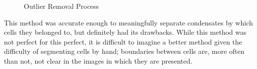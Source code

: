 \documentclass[11pt]{article}
\begin{document}
\begin{figure}[H]
    \centering
    {
    }\hfill{
    }\caption{Outlier Removal Process}
    \label{fig:outlier_removal}
\end{figure}


This method was accurate enough to meaningfully separate condensates by which cells they belonged
to, but definitely had its drawbacks. While this method was not perfect for this perfect, it is
difficult to imagine a better method given the difficulty of segmenting cells by hand; boundaries
between cells are, more often than not, not clear in the images in which they are presented. 
\end{document}
